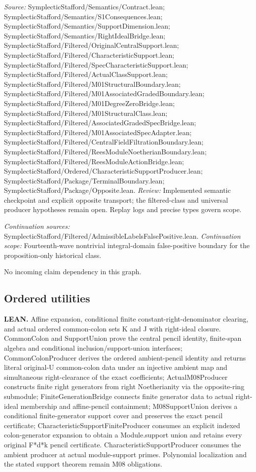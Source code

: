 \emph{Source:} SymplecticStafford/Semantics/Contract.lean; SymplecticStafford/Semantics/S1Consequences.lean; SymplecticStafford/Semantics/SupportDimension.lean; SymplecticStafford/Semantics/RightIdealBridge.lean; SymplecticStafford/Filtered/OriginalCentralSupport.lean; SymplecticStafford/Filtered/CharacteristicSupport.lean; SymplecticStafford/Filtered/SpecCharacteristicSupport.lean; SymplecticStafford/Filtered/ActualClassSupport.lean; SymplecticStafford/Filtered/M01StructuralBoundary.lean; SymplecticStafford/Filtered/M01AssociatedGradedBoundary.lean; SymplecticStafford/Filtered/M01DegreeZeroBridge.lean; SymplecticStafford/Filtered/M01StructuralClass.lean; SymplecticStafford/Filtered/AssociatedGradedSpecBridge.lean; SymplecticStafford/Filtered/M01AssociatedSpecAdapter.lean; SymplecticStafford/Filtered/CentralFieldFiltrationBoundary.lean; SymplecticStafford/Filtered/ReesModuleNoetherianBoundary.lean; SymplecticStafford/Filtered/ReesModuleActionBridge.lean; SymplecticStafford/Ordered/CharacteristicSupportProducer.lean; SymplecticStafford/Package/TerminalBoundary.lean; SymplecticStafford/Package/Opposite.lean.
\emph{Review:} Implemented semantic checkpoint and explicit opposite transport; the filtered-class and universal producer hypotheses remain open. Replay logs and precise types govern scope.

\emph{Continuation sources:} SymplecticStafford/Filtered/AdmissibleLabelsFalsePositive.lean.
\emph{Continuation scope:} Fourteenth-wave nontrivial integral-domain false-positive boundary for the proposition-only historical class.

No incoming claim dependency in this graph.
\subsection{Ordered utilities}\hypertarget{claim:ordered}{}\backmap
\textbf{LEAN.} Affine expansion, conditional finite constant-right-denominator clearing, and actual ordered common-colon sets K and J with right-ideal closure. CommonColon and SupportUnion prove the central pencil identity, finite-span algebra and conditional inclusion/support-union interfaces; CommonColonProducer derives the ordered ambient-pencil identity and returns literal original-U common-colon data under an injective ambient map and simultaneous right-clearance of the exact coefficients; ActualM08Producer constructs finite right generators from right Noetherianity via the opposite-ring submodule; FiniteGenerationBridge connects finite generator data to actual right-ideal membership and affine-pencil containment; M08SupportUnion derives a conditional finite-generator support cover and preserves the exact pencil certificate; CharacteristicSupportFiniteProducer consumes an explicit indexed colon-generator expansion to obtain a Module.support union and retains every original F*d*k pencil certificate. CharacteristicSupportProducer consumes the ambient producer at actual module-support primes. Polynomial localization and the stated support theorem remain M08 obligations.


